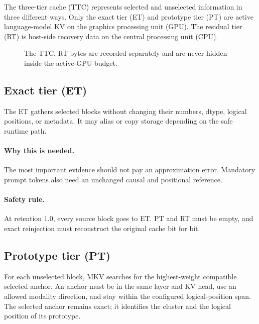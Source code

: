 \documentclass[11pt]{article}
\newcommand{\why}{\paragraph{Why this is needed.}}
\newcommand{\safety}{\paragraph{Safety rule.}}
\begin{document}
The three-tier cache (TTC) represents selected and unselected information in three different ways.
Only the exact tier (ET) and prototype tier (PT) are active language-model KV on the graphics
processing unit (GPU). The residual tier (RT) is host-side recovery data on the central processing
unit (CPU).

\begin{figure}[htbp]
\centering
{}
\caption{The TTC. RT bytes are recorded separately and are never hidden inside the active-GPU
budget.}
\label{fig:tiers}
\end{figure}

\subsection{Exact tier (ET)}

The ET gathers selected blocks without changing their numbers, dtype, logical positions, or
metadata. It may alias or copy storage depending on the safe runtime path.

\why The most important evidence should not pay an approximation error. Mandatory prompt tokens
also need an unchanged causal and positional reference.

\safety At retention 1.0, every source block goes to ET. PT and RT must be empty, and exact
reinjection must reconstruct the original cache bit for bit.

\subsection{Prototype tier (PT)}

For each unselected block, MKV searches for the highest-weight compatible selected anchor. An
anchor must be in the same layer and KV head, use an allowed modality direction, and stay within
the configured logical-position span. The selected anchor remains exact; it identifies the
cluster and the logical position of its prototype.
\end{document}
